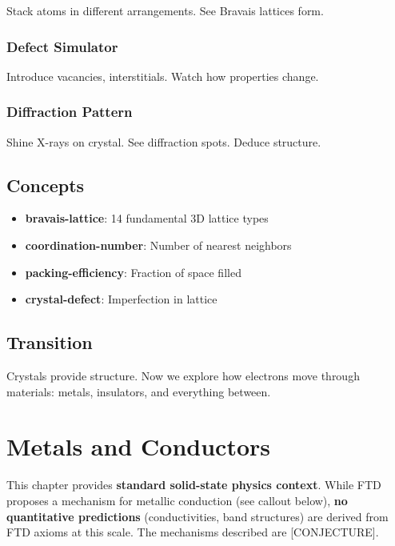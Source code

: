 \documentclass[
  11pt,
  letterpaper,
  twoside,
  openright]{book}
\providecommand{\tightlist}{%
  \setlength{\itemsep}{0pt}\setlength{\parskip}{0pt}}
\begin{document}
Stack atoms in different arrangements. See Bravais lattices form.

\subsection{Defect Simulator}\label{defect-simulator}

Introduce vacancies, interstitials. Watch how properties change.

\subsection{Diffraction Pattern}\label{diffraction-pattern}

Shine X-rays on crystal. See diffraction spots. Deduce structure.

\section{Concepts}\label{concepts-11}

\begin{itemize}
\tightlist
\item
  \textbf{bravais-lattice}: 14 fundamental 3D lattice types
\item
  \textbf{coordination-number}: Number of nearest neighbors
\item
  \textbf{packing-efficiency}: Fraction of space filled
\item
  \textbf{crystal-defect}: Imperfection in lattice
\end{itemize}

\section{Transition}\label{transition-11}

Crystals provide structure. Now we explore how electrons move through
materials: metals, insulators, and everything between.

\chapter{Metals and Conductors}\label{sec-metals-conductors}

\begin{tcolorbox}[enhanced jigsaw, leftrule=.75mm, title=\textcolor{quarto-callout-warning-color}{\faExclamationTriangle}\hspace{0.5em}{Pedagogical Context {[}NOT DERIVED FROM FTD{]}}, bottomrule=.15mm, opacityback=0, coltitle=black, arc=.35mm, colframe=quarto-callout-warning-color-frame, colbacktitle=quarto-callout-warning-color!10!white, colback=white, titlerule=0mm, breakable, bottomtitle=1mm, toptitle=1mm, rightrule=.15mm, toprule=.15mm, left=2mm, opacitybacktitle=0.6]

This chapter provides \textbf{standard solid-state physics context}.
While FTD proposes a mechanism for metallic conduction (see callout
below), \textbf{no quantitative predictions} (conductivities, band
structures) are derived from FTD axioms at this scale. The mechanisms
described are {[}CONJECTURE{]}.

\end{tcolorbox}
\end{document}
